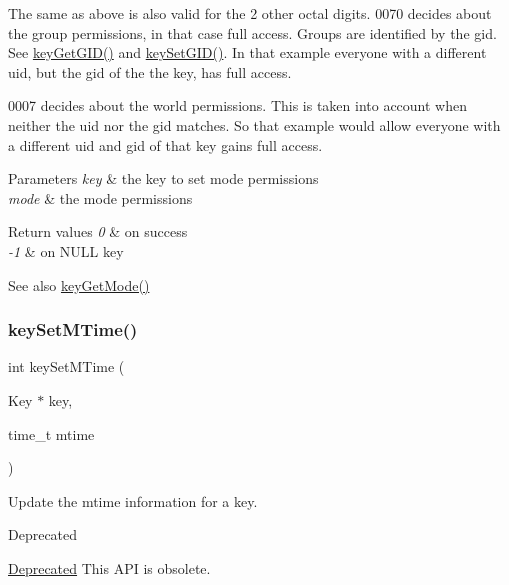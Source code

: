 The same as above is also valid for the 2 other octal digits. 0070 decides about the group permissions, in that case full access. Groups are identified by the gid. See \mbox{\hyperlink{group__meta_ga46a95e81d7d7f4e3eb59e60e5f3738c0}{key\+Get\+G\+I\+D()}} and \mbox{\hyperlink{group__meta_ga9e3d0fb3f7ba906e067727b9155d22e3}{key\+Set\+G\+I\+D()}}. In that example everyone with a different uid, but the gid of the the key, has full access.

0007 decides about the world permissions. This is taken into account when neither the uid nor the gid matches. So that example would allow everyone with a different uid and gid of that key gains full access.


\begin{DoxyParams}{Parameters}
{\em key} & the key to set mode permissions \\
\hline
{\em mode} & the mode permissions \\
\hline
\end{DoxyParams}

\begin{DoxyRetVals}{Return values}
{\em 0} & on success \\
\hline
{\em -\/1} & on N\+U\+LL key \\
\hline
\end{DoxyRetVals}
\begin{DoxySeeAlso}{See also}
\mbox{\hyperlink{group__meta_gabc0cec592ce3b77e9bc33dbc8e8f6bdc}{key\+Get\+Mode()}} 
\end{DoxySeeAlso}
\mbox{\label{group__meta_ga481d8997187992fe4bbf288bc8ef4db7}} 
\subsubsection{\texorpdfstring{keySetMTime()}{keySetMTime()}}
{\footnotesize\ttfamily int key\+Set\+M\+Time (\begin{DoxyParamCaption}\item[{Key $\ast$}]{key,  }\item[{time\+\_\+t}]{mtime }\end{DoxyParamCaption})}



Update the mtime information for a key. 

\begin{DoxyRefDesc}{Deprecated}
\item[\mbox{\hyperlink{deprecated__deprecated000024}{Deprecated}}]This A\+PI is obsolete.\end{DoxyRefDesc}



